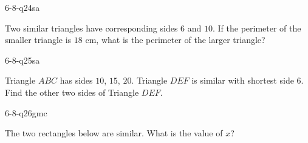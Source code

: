 \begin{practiceQuestion}{6-8-q24}{sa}
\begin{questionText}
Two similar triangles have corresponding sides $6$ and $10$. If the perimeter of the smaller triangle is $18$ cm, what is the perimeter of the larger triangle?
\end{questionText}
\end{practiceQuestion}

\begin{practiceQuestion}{6-8-q25}{sa}
\begin{questionText}
Triangle $ABC$ has sides $10$, $15$, $20$. Triangle $DEF$ is similar with shortest side $6$. Find the other two sides of Triangle $DEF$.
\end{questionText}
\end{practiceQuestion}


\begin{practiceQuestion}{6-8-q26}{gmc}
\begin{questionText}
The two rectangles below are similar. What is the value of $x$?

\begin{center}
\end{center}
\end{questionText}
\end{practiceQuestion}

